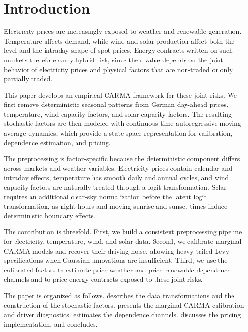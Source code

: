\section{Introduction}\label{sec:introduction}

Electricity prices are increasingly exposed to weather and renewable generation.
Temperature affects demand, while wind and solar production affect both the level
and the intraday shape of spot prices. Energy contracts written on such markets
therefore carry hybrid risk, since their value depends on the joint behavior of
electricity prices and physical factors that are non-traded or only partially
traded.

This paper develops an empirical CARMA framework for these joint risks. We first
remove deterministic seasonal patterns from German day-ahead prices,
temperature, wind capacity factors, and solar capacity factors. The resulting
stochastic factors are then modeled with continuous-time autoregressive
moving-average dynamics, which provide a state-space representation for
calibration, dependence estimation, and pricing.

The preprocessing is factor-specific because the deterministic component differs
across markets and weather variables. Electricity prices contain calendar and
intraday effects, temperature has smooth daily and annual cycles, and wind
capacity factors are naturally treated through a logit transformation. Solar
requires an additional clear-sky normalization before the latent logit
transformation, as night hours and moving sunrise and sunset times induce
deterministic boundary effects.

The contribution is threefold. First, we build a consistent preprocessing
pipeline for electricity, temperature, wind, and solar data. Second, we calibrate
marginal CARMA models and recover their driving noise, allowing heavy-tailed
Levy specifications when Gaussian innovations are insufficient. Third, we use
the calibrated factors to estimate price-weather and price-renewable dependence
channels and to price energy contracts exposed to these joint risks.

The paper is organized as follows.  describes the
data transformations and the construction of the stochastic factors.
 presents the marginal CARMA calibration
and driver diagnostics.  estimates the dependence
channels.  discusses the pricing implementation, and
 concludes.

